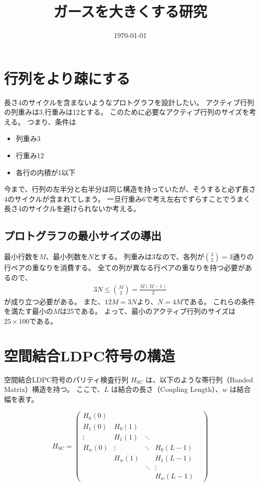 \documentclass[a4paper,11pt,dvipdfmx]{jsarticle}
\theoremstyle{definition}
\begin{document}
\title{ガースを大きくする研究}
\author{}
\date{\today}
\maketitle
\tableofcontents
\clearpage
\section{行列をより疎にする}
長さ4のサイクルを含まないようなプロトグラフを設計したい。
アクティブ行列の列重みは3,行重みは12とする。
このために必要なアクティブ行列のサイズを考える。
つまり、条件は
\begin{itemize}
  \item 列重み3
  \item 行重み12
  \item 各行の内積が1以下
\end{itemize}
今まで、行列の左半分と右半分は同じ構造を持っていたが、そうすると必ず長さ4のサイクルが含まれてしまう。
一旦行重み6で考え左右でずらすことでうまく長さ4のサイクルを避けられないか考える。
\subsection{プロトグラフの最小サイズの導出}
最小行数を$M$、最小列数を$N$とする。
列重みは3なので、各列が$\binom{3}{2} = 3$通りの行ペアの重なりを消費する。
全ての列が異なる行ペアの重なりを持つ必要があるので、
\begin{align}
  3N \leq \binom{M}{2} = \frac{M(M-1)}{2}
\end{align}
が成り立つ必要がある。
また、$12M=3N$より、$N=4M$である。
これらの条件を満たす最小の$M$は25である。
よって、最小のアクティブ行列のサイズは$25 \times 100$である。

\section{空間結合LDPC符号の構造}

空間結合LDPC符号のパリティ検査行列 $H_{\text{SC}}$ は、以下のような帯行列（Banded Matrix）構造を持つ。
ここで、$L$ は結合の長さ（Coupling Length）、$w$ は結合幅を表す。

\begin{equation}
H_{\text{SC}} = 
\begin{pmatrix}
H_0(0) &        &        &        & \\
H_1(0) & H_0(1) &        &        & \\
\vdots & H_1(1) & \ddots &        & \\
H_w(0) & \vdots & \ddots & H_0(L-1) & \\
       & H_w(1) &        & H_1(L-1) & \\
       &        & \ddots & \vdots   & \\
       &        &        & H_w(L-1) & 
\end{pmatrix}
\end{equation}


\end{document}
